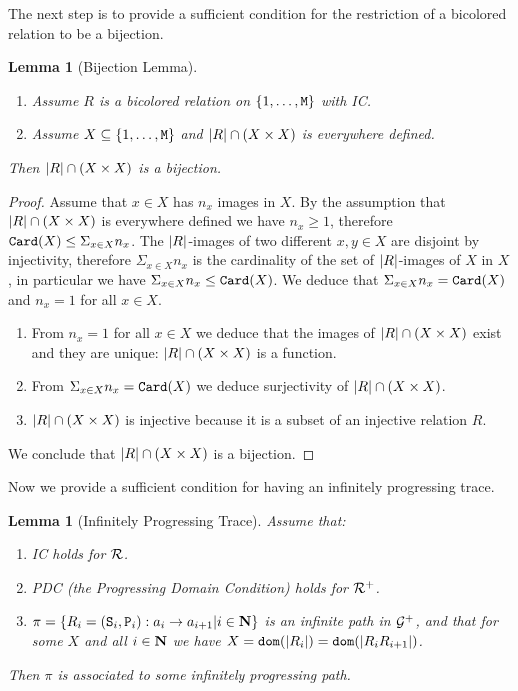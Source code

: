 \documentclass{lmcs}
\newtheorem{lemma}[theorem]{Lemma}
\begin{document}
The next step is to provide a sufficient condition for the restriction of a bicolored relation
to be a bijection.

\begin{lemma}[Bijection Lemma]
\label{lemma-bijection}
\begin{enumerate}
\item
Assume $R$ is a bicolored relation on $\{1, \ldots, {\tt M}\}$
with IC.  
\item
Assume $X \subseteq \{1, \ldots, {\tt M}\}$
and ${| R |} \cap (X \times X)$ is everywhere defined.
\end{enumerate}
Then ${| R |} \cap (X \times X)$ is a bijection. 
\end{lemma}

\begin{proof}
Assume that $x \in X$ has $n_x$ images in $X$. By the assumption that ${| R |} \cap (X \times X)$ is everywhere defined we have $n_x \ge 1$, therefore 
${\tt Card}(X) \le \Sigma_{x \in X} n_x$. 
The ${| R |}$-images of two different $x,y \in X$ are disjoint by injectivity, therefore $ \Sigma_{x \in X} n_x$ is the cardinality of the set of ${| R |}$-images of $X$ in $X$, in particular we have $\Sigma_{x \in X} n_x \le {\tt Card}(X)$. 
We deduce that $\Sigma_{x \in X} n_x = {\tt Card}(X)$ and $n_x=1$ for all $x \in X$. 
\begin{enumerate}
\item
From  $n_x=1$ for all $x \in X$ we deduce that the images of ${| R |} \cap (X \times X)$ exist and they are unique: ${| R |} \cap (X \times X)$ is a function.
\item
From $\Sigma_{x \in X} n_x = {\tt Card}(X)$ we deduce surjectivity of ${| R |} \cap (X \times X)$.
\item
${| R |} \cap (X \times X)$ is injective because it is a subset of an injective relation $R$.
\end{enumerate}
We conclude that ${| R |} \cap (X \times X)$ is a bijection.
\end{proof}

Now we provide a sufficient condition for having an infinitely progressing trace.

\begin{lemma}[Infinitely Progressing Trace]
\label{lemma-infinitely-progressing}
 Assume that:
\begin{enumerate}
\item
IC holds for ${\mathcal R}$. 
\item 
PDC (the Progressing Domain Condition) holds for ${\mathcal R}^+$. 
\item
$\pi = \{R_i = ({\tt S}_i,{\tt P}_i) : a_i \rightarrow a_{i+1} | i \in {\bf N} \}$ is an infinite path in ${\mathcal G}^+$, and that for some $X$ and all $i \in {\bf N}$ we have $X = {\tt dom}({| R_i |}) = {\tt dom}({| R_i R_{i+1} |})$.
\end{enumerate}
Then $\pi$ is associated to some infinitely progressing path.
\end{lemma}
\end{document}
